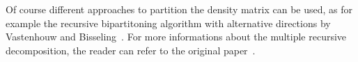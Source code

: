 \documentclass[prl,twocolumn,twocolumngrid,superbib]{revtex4} %
\begin{document}
 
 Of course different approaches to partition the density matrix can be 
 used, as for example the recursive bipartitoning algorithm with
 alternative directions by Vastenhouw and Bisseling~\cite{BVastenhouw}.
 For more informations about the multiple recursive decomposition, the reader can refer 
 to the original paper~\cite{LRomero95}.
\end{document}

